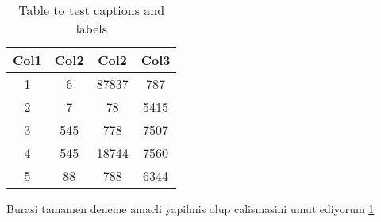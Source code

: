 \documentclass[12pt]{article}
\begin{document}
\begin{table}[h!]
\centering
\begin{tabular}{|c c c c|} 
 \hline
 Col1 & Col2 & Col2 & Col3 \\ [0.5ex] 
 \hline\hline
 1 & 6 & 87837 & 787 \\ 
 2 & 7 & 78 & 5415 \\
 3 & 545 & 778 & 7507 \\
 4 & 545 & 18744 & 7560 \\
 5 & 88 & 788 & 6344 \\ [1ex] 
 \hline
\end{tabular}
\caption{Table to test captions and labels}
\label{table:data}
\end{table}

Burasi tamamen deneme amacli yapilmis olup calismasini umut ediyorum \ref{table:data}

\cite[test.bib]{dirac}
\end{document}
